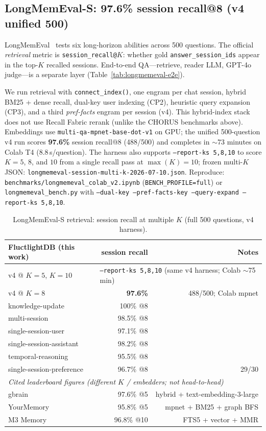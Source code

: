 \documentclass[11pt]{article}
\begin{document}
\subsection{LongMemEval-S: 97.6\% session recall@8 (v4 unified 500)}
LongMemEval~\cite{wu2024longmemeval} tests six long-horizon abilities across 500
questions. The official \emph{retrieval} metric is \texttt{session\_recall@$K$}:
whether gold \texttt{answer\_session\_ids} appear in the top-$K$ recalled
sessions. End-to-end QA---retrieve, reader LLM, GPT-4o judge---is a separate
layer (Table~\ref{tab:longmemeval-e2e}).

We run retrieval with \texttt{connect\_index()}, one engram per chat session,
hybrid BM25 + dense recall, dual-key user indexing (CP2), heuristic query
expansion (CP3), and a third \emph{pref-facts} engram per session (v4). This
hybrid-index stack does not use Recall Fabric rerank (unlike the CHORUS benchmarks
above). Embeddings use \texttt{multi-qa-mpnet-base-dot-v1} on GPU; the unified 500-question v4 run
scores \textbf{97.6\%} session recall@8 (488/500) and completes in $\sim$73 minutes on Colab T4
($8.8$\,s/question). The harness also supports \texttt{--report-ks 5,8,10} to
score $K{=}5$, $8$, and $10$ from a single recall pass at $\max(K){=}10$; frozen
multi-$K$ JSON: \texttt{longmemeval-session-multi-k-2026-07-10.json}. Reproduce:
\texttt{benchmarks/longmemeval\_colab\_v2.ipynb}
(\texttt{BENCH\_PROFILE=full}) or \texttt{longmemeval\_bench.py} with
\texttt{--dual-key --pref-facts-key --query-expand --report-ks 5,8,10}.

\begin{table}[h]
\centering
\caption{LongMemEval-S retrieval: session recall at multiple $K$ (full 500 questions, v4 harness).}
\begin{tabular}{lrr}
\toprule
\textbf{FluctlightDB (this work)} & \textbf{session recall} & \textbf{Notes} \\
\midrule
v4 @ $K{=}5$, $K{=}10$ & \multicolumn{2}{l}{\texttt{--report-ks 5,8,10} (same v4 harness; Colab $\sim$75\,min)} \\
v4 @ $K{=}8$ & \textbf{97.6\%} & 488/500; Colab mpnet \\
\quad knowledge-update & 100\% @8 & \\
\quad multi-session & 98.5\% @8 & \\
\quad single-session-user & 97.1\% @8 & \\
\quad single-session-assistant & 98.2\% @8 & \\
\quad temporal-reasoning & 95.5\% @8 & \\
\quad single-session-preference & 96.7\% @8 & 29/30 \\
\midrule
\multicolumn{3}{l}{\textit{Cited leaderboard figures (different $K$ / embedders; not head-to-head)}} \\
\midrule
gbrain & 97.6\% @5 & hybrid + text-embedding-3-large \\
YourMemory & 95.8\% @5 & mpnet + BM25 + graph BFS \\
M3 Memory & 96.8\% @10 & FTS5 + vector + MMR \\
\bottomrule
\end{tabular}
\end{table}
\end{document}
